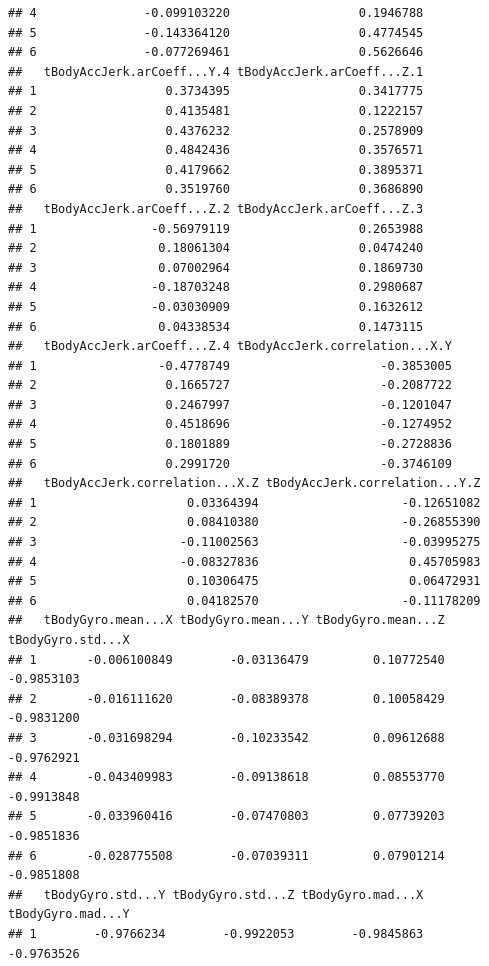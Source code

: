 \documentclass[
]{article}
\begin{document}
\begin{verbatim}
## 4               -0.099103220                  0.1946788
## 5               -0.143364120                  0.4774545
## 6               -0.077269461                  0.5626646
##   tBodyAccJerk.arCoeff...Y.4 tBodyAccJerk.arCoeff...Z.1
## 1                  0.3734395                  0.3417775
## 2                  0.4135481                  0.1222157
## 3                  0.4376232                  0.2578909
## 4                  0.4842436                  0.3576571
## 5                  0.4179662                  0.3895371
## 6                  0.3519760                  0.3686890
##   tBodyAccJerk.arCoeff...Z.2 tBodyAccJerk.arCoeff...Z.3
## 1                -0.56979119                  0.2653988
## 2                 0.18061304                  0.0474240
## 3                 0.07002964                  0.1869730
## 4                -0.18703248                  0.2980687
## 5                -0.03030909                  0.1632612
## 6                 0.04338534                  0.1473115
##   tBodyAccJerk.arCoeff...Z.4 tBodyAccJerk.correlation...X.Y
## 1                 -0.4778749                     -0.3853005
## 2                  0.1665727                     -0.2087722
## 3                  0.2467997                     -0.1201047
## 4                  0.4518696                     -0.1274952
## 5                  0.1801889                     -0.2728836
## 6                  0.2991720                     -0.3746109
##   tBodyAccJerk.correlation...X.Z tBodyAccJerk.correlation...Y.Z
## 1                     0.03364394                    -0.12651082
## 2                     0.08410380                    -0.26855390
## 3                    -0.11002563                    -0.03995275
## 4                    -0.08327836                     0.45705983
## 5                     0.10306475                     0.06472931
## 6                     0.04182570                    -0.11178209
##   tBodyGyro.mean...X tBodyGyro.mean...Y tBodyGyro.mean...Z tBodyGyro.std...X
## 1       -0.006100849        -0.03136479         0.10772540        -0.9853103
## 2       -0.016111620        -0.08389378         0.10058429        -0.9831200
## 3       -0.031698294        -0.10233542         0.09612688        -0.9762921
## 4       -0.043409983        -0.09138618         0.08553770        -0.9913848
## 5       -0.033960416        -0.07470803         0.07739203        -0.9851836
## 6       -0.028775508        -0.07039311         0.07901214        -0.9851808
##   tBodyGyro.std...Y tBodyGyro.std...Z tBodyGyro.mad...X tBodyGyro.mad...Y
## 1        -0.9766234        -0.9922053        -0.9845863        -0.9763526

\end{verbatim}
\end{document}
